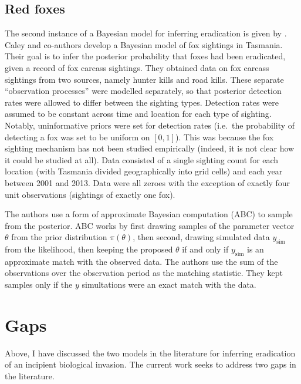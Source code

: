 \documentclass[
  oneside]{book}
\begin{document}
\hypertarget{red-foxes}{%
\subsection{Red foxes}\label{red-foxes}}

The second instance of a Bayesian model for inferring eradication is given by \citet{caley2015}. Caley and co-authors develop a Bayesian model of fox sightings in Tasmania. Their goal is to infer the posterior probability that foxes had been eradicated, given a record of fox carcass sightings. They obtained data on fox carcass sightings from two sources, namely hunter kills and road kills. These separate ``observation processes'' were modelled separately, so that posterior detection rates were allowed to differ between the sighting types. Detection rates were assumed to be constant across time and location for each type of sighting. Notably, uninformative priors were set for detection rates (i.e.~the probability of detecting a fox was set to be uniform on \([0, 1]\)). This was because the fox sighting mechanism has not been studied empirically (indeed, it is not clear how it could be studied at all). Data consisted of a single sighting count for each location (with Tasmania divided geographically into grid cells) and each year between 2001 and 2013. Data were all zeroes with the exception of exactly four unit observations (sightings of exactly one fox).

The authors use a form of approximate Bayesian computation (ABC) to sample from the posterior. ABC works by first drawing samples of the parameter vector \(\theta\) from the prior distribution \(\pi(\theta)\), then second, drawing simulated data \(y_{\text{sim}}\) from the likelihood, then keeping the proposed \(\theta\) if and only if \(y_{\text{sim}}\) is an approximate match with the observed data. The authors use the sum of the observations over the observation period as the matching statistic. They kept samples only if the \(y\) simultations were an exact match with the data.

\hypertarget{gaps}{%
\section{Gaps}\label{gaps}}

Above, I have discussed the two models in the literature for inferring eradication of an incipient biological invasion. The current work seeks to address two gaps in the literature.
\end{document}
